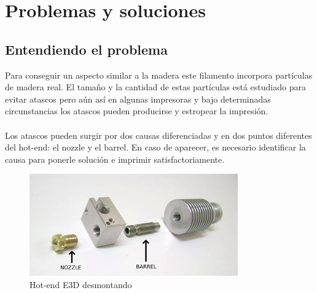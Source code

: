 \documentclass[11pt,a4paper]{article}
\begin{document}
\section{Problemas y soluciones}
	\subsection{Entendiendo el problema}
Para conseguir un aspecto similar a la madera este filamento incorpora partículas de madera real. El tamaño y la cantidad de estas partículas está estudiado para evitar atascos pero aún así en algunas impresoras y bajo determinadas circunstancias los atascos pueden producirse y estropear la impresión.\\\\
Los atascos pueden surgir por dos causas diferenciadas y en dos puntos diferentes del hot-end: el nozzle y el barrel. En caso de aparecer, es necesario identificar la causa para ponerle solución e imprimir satisfactoriamente.\begin{figure}[H]
\centering
\includegraphics[width=0.8\textwidth,cfbox=azul_marcos 4pt 0pt]{FOTOS/BARREL_AND_NOZZLE}
\caption*{Hot-end E3D desmontando}
\end{figure}
\end{document}
